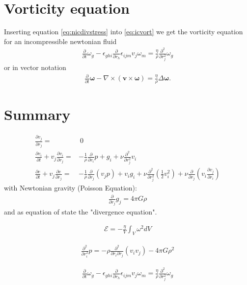 \documentclass[a4paper,
					fontsize=12pt,
					twoside,
					pagesize,
					cleardoublepage=plain,
					headsepline,
					bibliography=totoc
					]{scrbook}
\renewcommand{\vec}[1]{\boldsymbol{#1}}
\newcommand{\lra}[1]{{ \left( #1 \right) }}
\newcommand{\pd}[1]{\frac{\partial}{\partial #1}}
\newcommand{\ppd}[2]{\frac{\partial #2}{\partial #1}}
\newcommand{\pdd}[1]{\frac{\partial^2}{\partial #1^2}}
\begin{document}
\section{Vorticity equation}
Inserting equation \eqref{eq:nicdivstress} into \ref{eq:icvort}
we get the vorticity equation for an incompressible newtonian fluid
\begin{align}
\pd{t}\omega_g
-\epsilon_{ghi}\pd{r_h} \epsilon_{ijm} v_j \omega_m =
\frac{\eta}{\rho}\pdd{r_j}\omega_g
\end{align}
or in vector notation
\begin{align}
\pd{t} \vec{\omega}-\nabla \times (\vec{v} \times \vec{\omega}) = 
\frac{\eta}{\rho} \Delta \vec{\omega}.
\end{align}

\section{Summary}

\begin{align}
\ppd{r_j}{v_j} =&\ 0\\
\ppd{t}{v_i} + v_j \ppd{r_j}{v_i} =& -\frac{1}{\rho}\pd{r_i}p + g_i
+\nu\pdd{r_j}v_i\\
\ppd{t}{e} + v_j \ppd{r_j}{e} =& -\frac{1}{\rho} \pd{r_j}(v_j p) + v_i g_i
+\nu \pdd{r_j}\lra{\frac{1}{2}v_i^2}+ \nu \pd{r_j}\lra{v_i\ppd{r_i}{v_j}}
\end{align}
with Newtonian gravity (Poisson Equation):
\begin{align}
\pd{r_j}g_j=4\pi G \rho
\end{align}
and as equation of state the "divergence equation".

\begin{align}
\mathcal{E} = -\frac{\eta}{V} \int_V  \omega^2 dV
\label{eq:nicdiss}
\end{align}

\begin{align}
\pdd{r_i}p= 
-\rho \frac{\partial^2}{\partial r_i \partial r_j}(v_i v_j)
-4\pi G \rho^2
\end{align}

\begin{align}
\pd{t}\omega_g
-\epsilon_{ghi}\pd{r_h} \epsilon_{ijm} v_j \omega_m =
\frac{\eta}{\rho}\pdd{r_j}\omega_g
\end{align}
\end{document}
